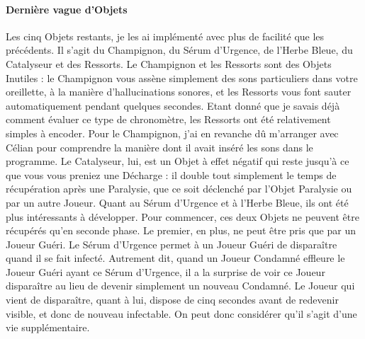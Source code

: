 \documentclass{article}
\begin{document}
\paragraph{Dernière vague d'Objets}
Les cinq Objets restants, je les ai implémenté avec plus de facilité que les précédents. Il s'agit du Champignon, du Sérum d'Urgence, de l'Herbe Bleue, du Catalyseur et des Ressorts. Le Champignon et les Ressorts sont des Objets Inutiles : le Champignon vous assène simplement des sons particuliers dans votre oreillette, à la manière d'hallucinations sonores, et les Ressorts vous font sauter automatiquement pendant quelques secondes. Etant donné que je savais déjà comment évaluer ce type de chronomètre, les Ressorts ont été relativement simples à encoder. Pour le Champignon, j'ai en revanche dû m'arranger avec Célian pour comprendre la manière dont il avait inséré les sons dans le programme. Le Catalyseur, lui, est un Objet à effet négatif qui reste jusqu'à ce que vous vous preniez une Décharge : il double tout simplement le temps de récupération après une Paralysie, que ce soit déclenché par l'Objet Paralysie ou par un autre Joueur. Quant au Sérum d'Urgence et à l'Herbe Bleue, ils ont été plus intéressants à développer. Pour commencer, ces deux Objets ne peuvent être récupérés qu'en seconde phase. Le premier, en plus, ne peut être pris que par un Joueur Guéri. Le Sérum d'Urgence permet à un Joueur Guéri de disparaître quand il se fait infecté. Autrement dit, quand un Joueur Condamné effleure le Joueur Guéri ayant ce Sérum d'Urgence, il a la surprise de voir ce Joueur disparaître au lieu de devenir simplement un nouveau Condamné. Le Joueur qui vient de disparaître, quant à lui, dispose de cinq secondes avant de redevenir visible, et donc de nouveau infectable. On peut donc considérer qu'il s'agit d'une vie supplémentaire.
\end{document}
